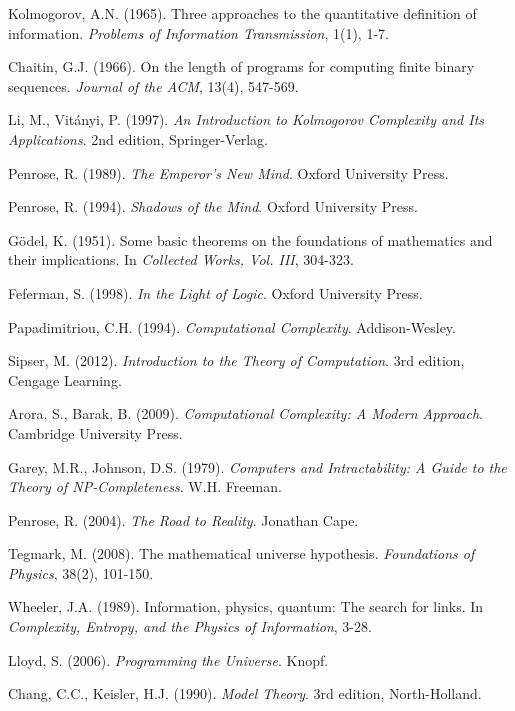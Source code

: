 \documentclass[12pt]{article}
\theoremstyle{plain}
\theoremstyle{definition}
\begin{document}
\begin{thebibliography}{99}
 Kolmogorov, A.N. (1965). Three approaches to the quantitative definition of information. \emph{Problems of Information Transmission}, 1(1), 1-7.

 Chaitin, G.J. (1966). On the length of programs for computing finite binary sequences. \emph{Journal of the ACM}, 13(4), 547-569.

 Li, M., Vitányi, P. (1997). \emph{An Introduction to Kolmogorov Complexity and Its Applications}. 2nd edition, Springer-Verlag.

 Penrose, R. (1989). \emph{The Emperor's New Mind}. Oxford University Press.

 Penrose, R. (1994). \emph{Shadows of the Mind}. Oxford University Press.

 Gödel, K. (1951). Some basic theorems on the foundations of mathematics and their implications. In \emph{Collected Works, Vol. III}, 304-323.

 Feferman, S. (1998). \emph{In the Light of Logic}. Oxford University Press.

 Papadimitriou, C.H. (1994). \emph{Computational Complexity}. Addison-Wesley.

 Sipser, M. (2012). \emph{Introduction to the Theory of Computation}. 3rd edition, Cengage Learning.

 Arora, S., Barak, B. (2009). \emph{Computational Complexity: A Modern Approach}. Cambridge University Press.

 Garey, M.R., Johnson, D.S. (1979). \emph{Computers and Intractability: A Guide to the Theory of NP-Completeness}. W.H. Freeman.

 Penrose, R. (2004). \emph{The Road to Reality}. Jonathan Cape.

 Tegmark, M. (2008). The mathematical universe hypothesis. \emph{Foundations of Physics}, 38(2), 101-150.

 Wheeler, J.A. (1989). Information, physics, quantum: The search for links. In \emph{Complexity, Entropy, and the Physics of Information}, 3-28.

 Lloyd, S. (2006). \emph{Programming the Universe}. Knopf.

 Chang, C.C., Keisler, H.J. (1990). \emph{Model Theory}. 3rd edition, North-Holland.


\end{thebibliography}
\end{document}

